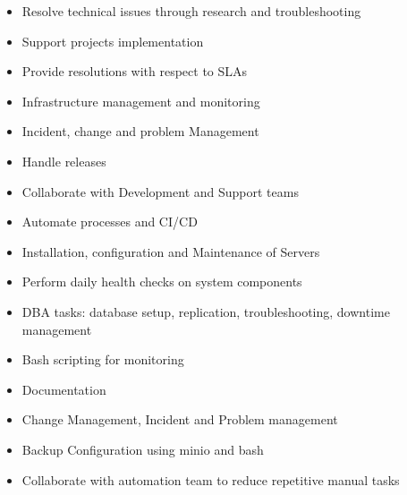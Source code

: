 \documentclass[10pt,a4paper,ragged2e,withhyper]{altacv}
\begin{document}
\begin{paracol}{2}



\begin{itemize}
\item Resolve technical issues through research and troubleshooting
\item Support projects implementation 
\item Provide resolutions with respect to SLAs
\item Infrastructure management and monitoring
\item Incident, change and problem Management
\item Handle releases
\item Collaborate with Development and Support teams
\item Automate processes and CI/CD
\end{itemize}

\divider

\begin{itemize}
\item Installation, configuration and Maintenance of Servers
\item Perform daily health checks on system components
\item DBA tasks: database setup, replication, troubleshooting, downtime management
\item Bash scripting for monitoring
\item Documentation
\item Change Management, Incident and Problem management
\item Backup Configuration using minio and bash
\item Collaborate with automation team to reduce repetitive manual tasks
\end{itemize}


\end{paracol}
\end{document}
